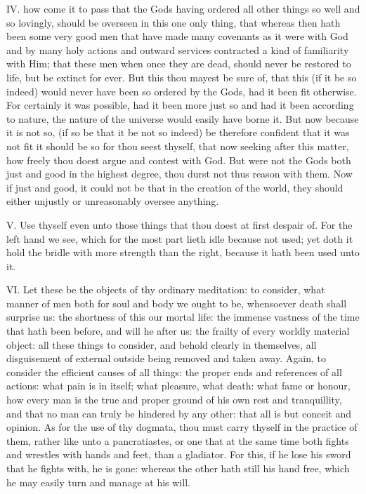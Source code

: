 IV. how come it to pass that the Gods having ordered all other things
so well and so lovingly, should be overseen in this one only thing, that
whereas then hath been some very good men that have made many covenants as
it were with God and by many holy actions and outward services contracted
a kind of familiarity with Him; that these men when once they are dead,
should never be restored to life, but be extinct for ever. But this thou
mayest be sure of, that this (if it be so indeed) would never have been so
ordered by the Gods, had it been fit otherwise. For certainly it was
possible, had it been more just so and had it been according to nature,
the nature of the universe would easily have borne it. But now because it
is not so, (if so be that it be not so indeed) be therefore confident that
it was not fit it should be so for thou seest thyself, that now seeking
after this matter, how freely thou doest argue and contest with God. But
were not the Gods both just and good in the highest degree, thou durst not
thus reason with them. Now if just and good, it could not be that in the
creation of the world, they should either unjustly or unreasonably oversee
anything.

V. Use thyself even unto those things that thou doest at first despair
of. For the left hand we see, which for the most part lieth idle because
not used; yet doth it hold the bridle with more strength than the right,
because it hath been used unto it.

VI. Let these be the objects of thy ordinary meditation: to consider,
what manner of men both for soul and body we ought to be, whensoever death
shall surprise us: the shortness of this our mortal life: the immense
vastness of the time that hath been before, and will he after us: the
frailty of every worldly material object: all these things to consider,
and behold clearly in themselves, all disguisement of external outside
being removed and taken away. Again, to consider the efficient causes of
all things: the proper ends and references of all actions: what pain is in
itself; what pleasure, what death: what fame or honour, how every man is
the true and proper ground of his own rest and tranquillity, and that no
man can truly be hindered by any other: that all is but conceit and
opinion. As for the use of thy dogmata, thou must carry thyself in the
practice of them, rather like unto a pancratiastes, or one that at the
same time both fights and wrestles with hands and feet, than a gladiator.
For this, if he lose his sword that he fights with, he is gone: whereas
the other hath still his hand free, which he may easily turn and manage at
his will.

